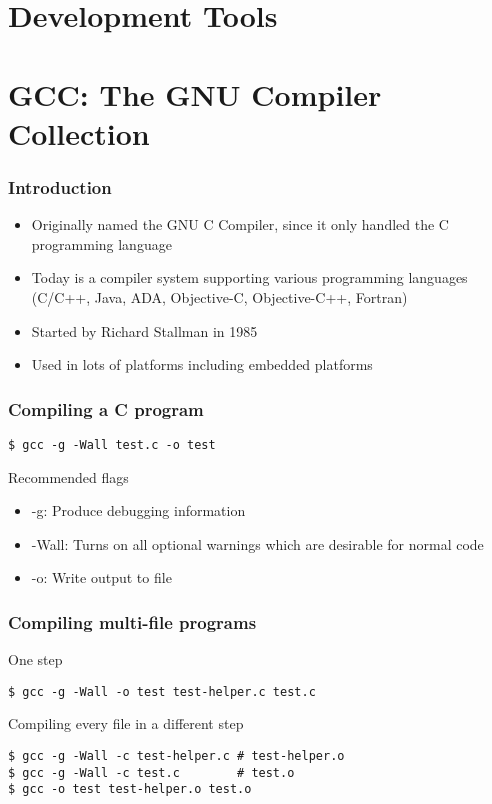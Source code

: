 \section{Development Tools}

\section{GCC: The GNU Compiler Collection}

\begin{frame}
  \frametitle{Introduction}

  \begin{itemize}
  \item Originally named the GNU C Compiler, since it only handled
    the C programming language
  \item Today is a compiler system supporting various programming
    languages (C/C++, Java, ADA, Objective-C, Objective-C++, Fortran)
  \item Started by Richard Stallman in 1985
  \item Used in lots of platforms including embedded platforms
  \end{itemize}
\end{frame}

\begin{frame}[fragile]
  \frametitle{Compiling a C program}
\begin{verbatim}
$ gcc -g -Wall test.c -o test
\end{verbatim}
  Recommended flags
  \begin{itemize}
  \item -g: Produce debugging information
  \item -Wall: Turns on all optional warnings which are desirable for
    normal code
  \item -o: Write output to file
  \end{itemize}
\end{frame}

\begin{frame}[fragile]
  \frametitle{Compiling multi-file programs}

  One step
\begin{verbatim}
$ gcc -g -Wall -o test test-helper.c test.c
\end{verbatim}

  Compiling every file in a different step
\begin{verbatim}
$ gcc -g -Wall -c test-helper.c # test-helper.o
$ gcc -g -Wall -c test.c        # test.o
$ gcc -o test test-helper.o test.o
\end{verbatim}
\end{frame}

